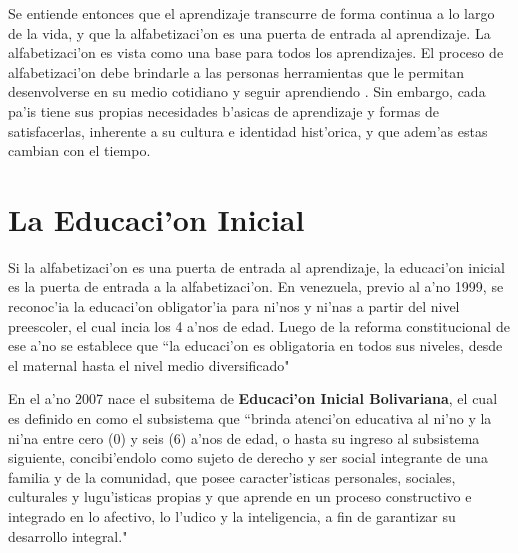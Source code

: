Se entiende entonces que el aprendizaje transcurre de forma continua a lo largo de la vida, y que la alfabetizaci'on es una puerta de entrada al aprendizaje. La alfabetizaci'on es vista como una base para todos los aprendizajes. El proceso de alfabetizaci'on debe brindarle a las personas herramientas que le permitan desenvolverse en su medio cotidiano y seguir aprendiendo \cite{infante13}. Sin embargo, cada pa'is tiene sus propias necesidades b'asicas de aprendizaje y formas de satisfacerlas, inherente a su cultura e identidad hist'orica, y que adem'as estas cambian con el tiempo.


\section{La Educaci'on Inicial}


Si la alfabetizaci'on es una puerta de entrada al aprendizaje, la educaci'on inicial es la puerta de entrada a la alfabetizaci'on. En venezuela, previo al a'no 1999, se reconoc'ia la educaci'on obligator'ia para ni'nos y ni'nas a partir del nivel preescoler, el cual incia los 4 a'nos de edad. Luego de la reforma constitucional de ese a'no se establece que ``la educaci'on es obligatoria en todos sus niveles, desde el maternal hasta el nivel medio diversificado" \cite{UnescoAEPI}

En el a'no 2007 nace el subsitema de \textbf{Educaci'on Inicial Bolivariana}, el cual es definido en \cite{CurriculoSEIB} como el subsistema que ``brinda atenci'on educativa al ni'no y la ni'na entre cero (0) y seis (6) a'nos de edad, o hasta su ingreso al subsistema siguiente, concibi'endolo como sujeto de derecho y ser social integrante de una familia y de la comunidad, que posee caracter'isticas personales, sociales, culturales y lugu'isticas propias y que aprende en un proceso constructivo e integrado en lo afectivo, lo l'udico y la inteligencia, a fin de garantizar su desarrollo integral."

